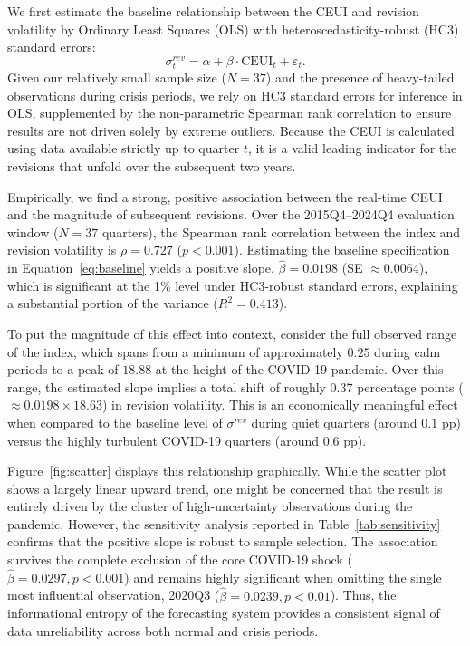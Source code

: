 \documentclass[12pt,a4paper]{article}
\theoremstyle{remark}
\begin{document}
We first estimate the baseline relationship between the CEUI and revision volatility by Ordinary Least Squares (OLS) with heteroscedasticity-robust (HC3) standard errors:
\begin{equation}
\label{eq:baseline}
\sigma^{rev}_t = \alpha + \beta \cdot \text{CEUI}_t + \varepsilon_t .
\end{equation}
Given our relatively small sample size ($N = 37$) and the presence of heavy-tailed observations during crisis periods, we rely on HC3 standard errors for inference in OLS, supplemented by the non-parametric Spearman rank correlation to ensure results are not driven solely by extreme outliers. Because the CEUI is calculated using data available strictly up to quarter $t$, it is a valid leading indicator for the revisions that unfold over the subsequent two years.

Empirically, we find a strong, positive association between the real-time CEUI and the magnitude of subsequent revisions. Over the 2015Q4--2024Q4 evaluation window ($N = 37$ quarters), the Spearman rank correlation between the index and revision volatility is $\rho = 0.727$ ($p < 0.001$). Estimating the baseline specification in Equation~\eqref{eq:baseline} yields a positive slope, $\hat{\beta} = 0.0198$ (SE $\approx 0.0064$), which is significant at the 1\% level under HC3-robust standard errors, explaining a substantial portion of the variance ($R^2 = 0.413$). 

To put the magnitude of this effect into context, consider the full observed range of the index, which spans from a minimum of approximately $0.25$ during calm periods to a peak of $18.88$ at the height of the COVID-19 pandemic. Over this range, the estimated slope implies a total shift of roughly $0.37$ percentage points ($\approx 0.0198 \times 18.63$) in revision volatility. This is an economically meaningful effect when compared to the baseline level of $\sigma^{rev}$ during quiet quarters (around $0.1$ pp) versus the highly turbulent COVID-19 quarters (around $0.6$ pp). 

Figure~\ref{fig:scatter} displays this relationship graphically. While the scatter plot shows a largely linear upward trend, one might be concerned that the result is entirely driven by the cluster of high-uncertainty observations during the pandemic. However, the sensitivity analysis reported in Table~\ref{tab:sensitivity} confirms that the positive slope is robust to sample selection. The association survives the complete exclusion of the core COVID-19 shock ($\hat{\beta} = 0.0297, p < 0.001$) and remains highly significant when omitting the single most influential observation, 2020Q3 ($\hat{\beta} = 0.0239, p < 0.01$). Thus, the informational entropy of the forecasting system provides a consistent signal of data unreliability across both normal and crisis periods.
\end{document}
